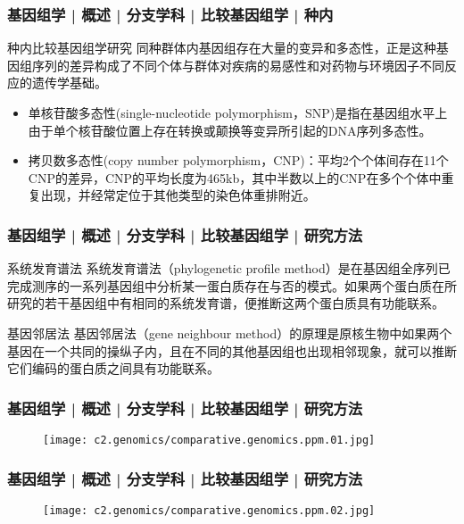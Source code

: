 \begin{frame}
  \frametitle{基因组学 | 概述 | 分支学科 | 比较基因组学 | 种内}
  \begin{block}{种内比较基因组学研究}
同种群体内基因组存在大量的变异和多态性，正是这种基因组序列的差异构成了不同个体与群体对疾病的易感性和对药物与环境因子不同反应的遗传学基础。
\begin{itemize}
  \item 单核苷酸多态性(single-nucleotide polymorphism，SNP)是指在基因组水平上由于单个核苷酸位置上存在转换或颠换等变异所引起的DNA序列多态性。
  \item 拷贝数多态性(copy number polymorphism，CNP)：平均2个个体间存在11个CNP的差异，CNP的平均长度为465kb，其中半数以上的CNP在多个个体中重复出现，并经常定位于其他类型的染色体重排附近。
\end{itemize}
  \end{block}
\end{frame}

\begin{frame}
  \frametitle{基因组学 | 概述 | 分支学科 | 比较基因组学 | 研究方法}
  \begin{block}{系统发育谱法}
系统发育谱法（phylogenetic profile method）是在基因组全序列已完成测序的一系列基因组中分析某一蛋白质存在与否的模式。如果两个蛋白质在所研究的若干基因组中有相同的系统发育谱，便推断这两个蛋白质具有功能联系。
  \end{block}
  \pause
  \begin{block}{基因邻居法}
    基因邻居法（gene neighbour method）的原理是原核生物中如果两个基因在一个共同的操纵子内，且在不同的其他基因组也出现相邻现象，就可以推断它们编码的蛋白质之间具有功能联系。
  \end{block}
\end{frame}

\begin{frame}
  \frametitle{基因组学 | 概述 | 分支学科 | 比较基因组学 | 研究方法}
  \begin{figure}
    \centering
    \texttt{[image: c2.genomics/comparative.genomics.ppm.01.jpg]}
  \end{figure}
\end{frame}

\begin{frame}
  \frametitle{基因组学 | 概述 | 分支学科 | 比较基因组学 | 研究方法}
  \begin{figure}
    \centering
    \texttt{[image: c2.genomics/comparative.genomics.ppm.02.jpg]}
  \end{figure}
\end{frame}


